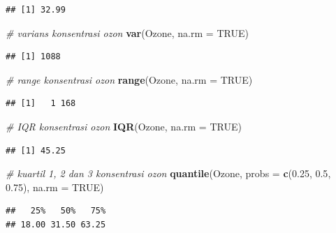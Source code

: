 \documentclass[
]{book}
\newenvironment{Shaded}{\begin{snugshade}}{\end{snugshade}}
\newcommand{\AttributeTok}[1]{\textcolor[rgb]{0.13,0.29,0.53}{#1}}
\newcommand{\CommentTok}[1]{\textcolor[rgb]{0.56,0.35,0.01}{\textit{#1}}}
\newcommand{\ConstantTok}[1]{\textcolor[rgb]{0.56,0.35,0.01}{#1}}
\newcommand{\FloatTok}[1]{\textcolor[rgb]{0.00,0.00,0.81}{#1}}
\newcommand{\FunctionTok}[1]{\textcolor[rgb]{0.13,0.29,0.53}{\textbf{#1}}}
\newcommand{\NormalTok}[1]{#1}
\theoremstyle{definition}
\theoremstyle{definition}
\theoremstyle{definition}
\theoremstyle{definition}
\theoremstyle{remark}
\begin{document}
\begin{verbatim}
## [1] 32.99
\end{verbatim}

\begin{Shaded}
\begin{Highlighting}[]
\CommentTok{\# varians konsentrasi ozon}
\FunctionTok{var}\NormalTok{(Ozone, }\AttributeTok{na.rm =} \ConstantTok{TRUE}\NormalTok{)}
\end{Highlighting}
\end{Shaded}

\begin{verbatim}
## [1] 1088
\end{verbatim}

\begin{Shaded}
\begin{Highlighting}[]
\CommentTok{\# range konsentrasi ozon}
\FunctionTok{range}\NormalTok{(Ozone, }\AttributeTok{na.rm =} \ConstantTok{TRUE}\NormalTok{)}
\end{Highlighting}
\end{Shaded}

\begin{verbatim}
## [1]   1 168
\end{verbatim}

\begin{Shaded}
\begin{Highlighting}[]
\CommentTok{\# IQR konsentrasi ozon}
\FunctionTok{IQR}\NormalTok{(Ozone, }\AttributeTok{na.rm =} \ConstantTok{TRUE}\NormalTok{)}
\end{Highlighting}
\end{Shaded}

\begin{verbatim}
## [1] 45.25
\end{verbatim}

\begin{Shaded}
\begin{Highlighting}[]
\CommentTok{\# kuartil 1, 2 dan 3 konsentrasi ozon}
\FunctionTok{quantile}\NormalTok{(Ozone, }\AttributeTok{probs =} \FunctionTok{c}\NormalTok{(}\FloatTok{0.25}\NormalTok{, }\FloatTok{0.5}\NormalTok{, }\FloatTok{0.75}\NormalTok{), }\AttributeTok{na.rm =} \ConstantTok{TRUE}\NormalTok{)}
\end{Highlighting}
\end{Shaded}

\begin{verbatim}
##   25%   50%   75% 
## 18.00 31.50 63.25
\end{verbatim}
\end{document}
